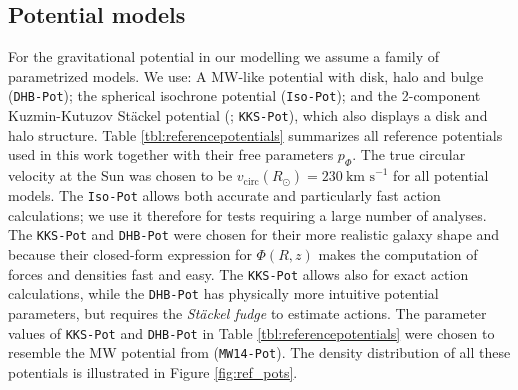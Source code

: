 \documentclass[iop,revtex4,numberedappendix,appendixfloats]{emulateapj}
\begin{document}

\subsection{Potential models} \label{sec:potentials}

For the gravitational potential in our modelling we assume a family of parametrized models. We use: A MW-like potential with disk, halo and bulge (\texttt{DHB-Pot}); the spherical isochrone potential (\texttt{Iso-Pot}); and the 2-component Kuzmin-Kutuzov St\"{a}ckel potential (\citealt{1994AA...287...43B}; \texttt{KKS-Pot}), which also displays a disk and halo structure. Table \ref{tbl:referencepotentials} summarizes all reference potentials used in this work together with their free parameters $p_\Phi$. The true circular velocity at the Sun was chosen to be $v_\text{circ}(R_\odot)=230~\text{km s}^{-1}$ for all potential models. The \texttt{Iso-Pot} allows both accurate and particularly fast action calculations; we use it therefore for tests requiring a large number of analyses. The \texttt{KKS-Pot} and \texttt{DHB-Pot} were chosen for their more realistic galaxy shape and because their closed-form expression for $\Phi(R,z)$ makes the computation of forces and densities fast and easy. The \texttt{KKS-Pot} allows also for exact action calculations, while the \texttt{DHB-Pot} has physically more intuitive potential parameters, but requires the \emph{St\"{a}ckel fudge} to estimate actions. The parameter values of \texttt{KKS-Pot} and \texttt{DHB-Pot} in Table \ref{tbl:referencepotentials} were chosen to resemble the MW potential from \citet{2015ApJS..216...29B} (\texttt{MW14-Pot}). The density distribution of all these potentials is illustrated in Figure \ref{fig:ref_pots}. 

\end{document}
